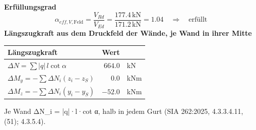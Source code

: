 \documentclass[11pt,a4paper]{article}
\begin{document}
\noindent\textbf{Erfüllungsgrad}
\begin{equation*}
\alpha_{eff,V,\text{Feld}} = \frac{V_{Rd}}{V_{Ed}} = \frac{177.4\,\mathrm{kN}}{171.2\,\mathrm{kN}} = 1.04 \quad \Rightarrow \quad \text{erfüllt}
\end{equation*}
\noindent\textbf{Längszugkraft aus dem Druckfeld der Wände, je Wand in ihrer Mitte}
\begin{longtable}{lrl}
\hline
Längszugkraft & Wert &  \\
\hline
\endhead
$\Delta N = \sum |q|\, l \cot\alpha$ & $664.0$ & kN \\
$\Delta M_y = -\sum \Delta N_i (z_i - z_S)$ & $0.0$ & kNm \\
$\Delta M_z = -\sum \Delta N_i (y_i - y_S)$ & $-52.0$ & kNm \\
\hline
\end{longtable}
Je Wand ΔN\_i = |q|·l·cot α, halb in jedem Gurt (SIA 262:2025, 4.3.3.4.11, (51); 4.3.5.4).
\end{document}
